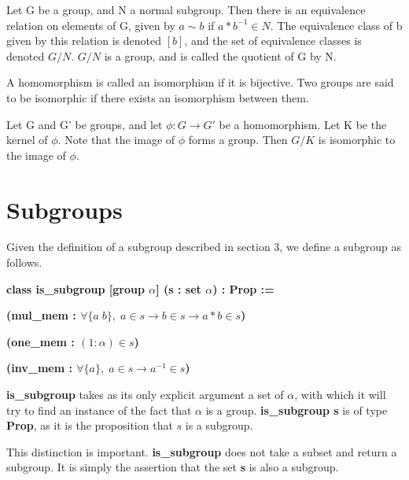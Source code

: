 \documentclass[runningheads,a4paper]{llncs}
\renewcommand{\a}{\alpha}
\renewcommand{\-}{\setminus}
\begin{document}
\begin{definition}
Let G be a group, and N a normal subgroup. Then there is an equivalence relation on elements of G, given by $a \sim b$ if $a * b^{-1} \in N$. The equivalence class of b given by this relation is denoted $[b]$, and the set of equivalence classes is denoted $G/N$. $G/N$ is a group, and is called the quotient of G by N.
\end{definition}

\begin{definition}[Isomorphism]
A homomorphism is called an isomorphism if it is bijective. Two groups are said to be isomorphic if there exists an isomorphism between them.
\end{definition}

\begin{theorem}
Let G and G' be groups, and let $\phi : G \to G'$ be a homomorphism. Let K be the kernel of $\phi$. Note that the image of $\phi$ forms a group. Then $G/K$ is isomorphic to the image of $\phi$.
\end{theorem}

\section{Subgroups}

Given the definition of a subgroup described in section 3, we define a subgroup as follows.

\vspace{2 mm}
\hspace{2 em}\textbf{class is\_subgroup [group $\a$] (s : set $\a$) : Prop :=}

\hspace{4 em}\textbf{(mul\_mem : $\forall \{a\; b\},\; a \in s \to b \in s \to a * b \in s$)}

\hspace{4 em}\textbf{(one\_mem : $(1 : \a) \in s$)}

\hspace{4 em}\textbf{(inv\_mem : $\forall \{a\},\; a \in s \to a^{-1} \in s$)}
\vspace{2 mm}

\textbf{is\_subgroup} takes as its only explicit argument a set of $\a$, with which it will try to find an instance of the fact that $\a$ is a group. \textbf{is\_subgroup s} is of type \textbf{Prop}, as it is the proposition that $s$ is a subgroup.

This distinction is important. \textbf{is\_subgroup} does not take a subset and return a subgroup. It is simply the assertion that the set \textbf{s} is also a subgroup.
\end{document}
